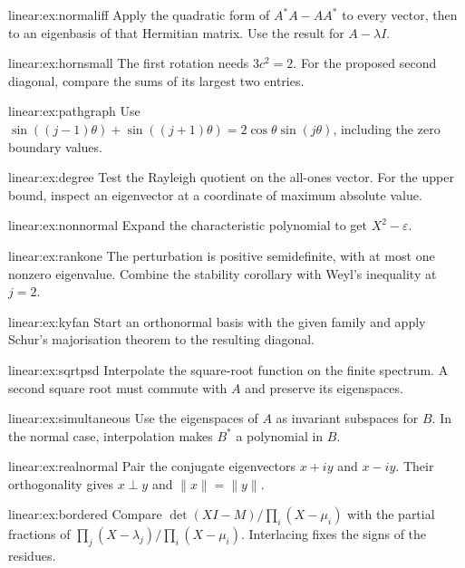 \begin{hint}{linear:ex:normaliff}
Apply the quadratic form of $A^*A-AA^*$ to every vector, then to an eigenbasis of that Hermitian matrix. Use the result for $A-\lambda I$.
\end{hint}
\begin{hint}{linear:ex:hornsmall}
The first rotation needs $3c^2=2$. For the proposed second diagonal, compare the sums of its largest two entries.
\end{hint}
\begin{hint}{linear:ex:pathgraph}
Use $\sin((j-1)\theta)+\sin((j+1)\theta)=2\cos\theta\sin(j\theta)$, including the zero boundary values.
\end{hint}
\begin{hint}{linear:ex:degree}
Test the Rayleigh quotient on the all-ones vector. For the upper bound, inspect an eigenvector at a coordinate of maximum absolute value.
\end{hint}
\begin{hint}{linear:ex:nonnormal}
Expand the characteristic polynomial to get $X^2-\varepsilon$.
\end{hint}
\begin{hint}{linear:ex:rankone}
The perturbation is positive semidefinite, with at most one nonzero eigenvalue. Combine the stability corollary with Weyl's inequality at $j=2$.
\end{hint}
\begin{hint}{linear:ex:kyfan}
Start an orthonormal basis with the given family and apply Schur's majorisation theorem to the resulting diagonal.
\end{hint}
\begin{hint}{linear:ex:sqrtpsd}
Interpolate the square-root function on the finite spectrum. A second square root must commute with $A$ and preserve its eigenspaces.
\end{hint}
\begin{hint}{linear:ex:simultaneous}
Use the eigenspaces of $A$ as invariant subspaces for $B$. In the normal case, interpolation makes $B^*$ a polynomial in $B$.
\end{hint}
\begin{hint}{linear:ex:realnormal}
Pair the conjugate eigenvectors $x+iy$ and $x-iy$. Their orthogonality gives $x\perp y$ and $\|x\|=\|y\|$.
\end{hint}
\begin{hint}{linear:ex:bordered}
Compare $\det(XI-M)/\prod_i(X-\mu_i)$ with the partial fractions of $\prod_j(X-\lambda_j)/\prod_i(X-\mu_i)$. Interlacing fixes the signs of the residues.
\end{hint}
